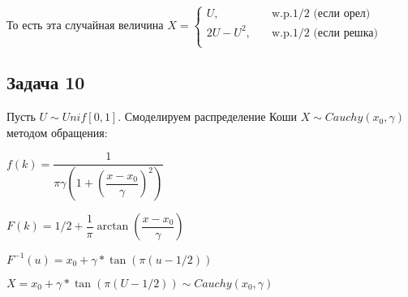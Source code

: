 \documentclass[a4paper,12pt]{article} %
\begin{document}
 То есть эта случайная величина 
 $X = \begin{cases}
U, \quad \quad \quad  & \text{w.p.1/2 (если орел)} \\
2U-U^2, \quad   &\text{w.p.1/2 (если решка)} \\
\end{cases}$
  
  
  \subsection*{Задача 10}
  
  Пусть $U\sim Unif[0,1]$. Смоделируем распределение Коши $X\sim Cauchy (x_0,\gamma)$ методом обращения: 
  
  $f(k) = \dfrac{1}{\pi \gamma \left(1+\left( \dfrac{x-x_0}{\gamma}\right) ^2\right )}$
  
  $F(k)= 1/2 + \dfrac{1}{\pi} \arctan \left( \dfrac{x-x_0}{\gamma}\right) 
  $
  
  $F^{-1}(u)=x_0 + \gamma *  \tan(\pi ( u-1/2))
  $
  
 
  $X = x_0 + \gamma * \tan(\pi(U-1/2)) \sim Cauchy (x_0,\gamma)$	

 
  
  
  
\end{document}
